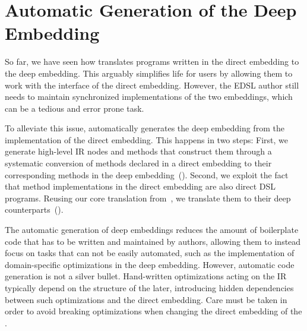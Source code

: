 \section{Automatic Generation of the Deep Embedding}
\label{sec:deep-gen}

So far, we have seen how \yy translates programs written in the
direct embedding to the deep embedding. This arguably simplifies life
for \edsl users by allowing them to work with the interface of the
direct embedding.  However, the EDSL author still needs to maintain synchronized
 implementations of the two embeddings, which can be a tedious and error prone task.

To alleviate this issue, \yy automatically generates the deep embedding from
the implementation of the direct embedding. This happens in two steps: First, we
generate high-level IR nodes and methods that construct them through a
systematic conversion of methods declared in a direct embedding to their
corresponding methods in the deep embedding~().
%
Second, we exploit the fact that method implementations in the direct
embedding are also direct DSL programs.  Reusing our core translation
from~, we translate them to their deep
counterparts~().


The automatic generation of deep embeddings reduces the amount of
boilerplate code that has to be written and maintained by \edsl
authors, allowing them to instead focus on tasks that can not be
easily automated, such as the implementation of domain-specific
optimizations in the deep embedding.  However, automatic code
generation is not a silver bullet.  Hand-written optimizations acting
on the IR typically depend on the structure of the later, introducing
hidden dependencies between such optimizations and the direct
embedding.  Care must be taken in order to avoid breaking
optimizations when changing the direct embedding of the \edsl.



